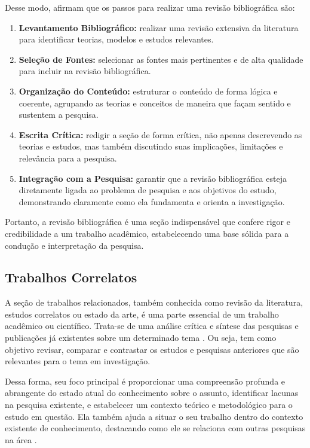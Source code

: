 Desse modo,  afirmam que os passos para realizar uma revisão bibliográfica são:
\begin{enumerate}[label=\roman*., itemsep=0pt, leftmargin=2.5cm]
    \item \textbf{Levantamento Bibliográfico:} realizar uma revisão extensiva da literatura para identificar teorias, modelos e estudos relevantes.
    \item \textbf{Seleção de Fontes:} selecionar as fontes mais pertinentes e de alta qualidade para incluir na revisão bibliográfica.
    \item \textbf{Organização do Conteúdo:} estruturar o conteúdo de forma lógica e coerente, agrupando as teorias e conceitos de maneira que façam sentido e sustentem a pesquisa.
    \item \textbf{Escrita Crítica:} redigir a seção de forma crítica, não apenas descrevendo as teorias e estudos, mas também discutindo suas implicações, limitações e relevância para a pesquisa.
    \item \textbf{Integração com a Pesquisa:} garantir que a revisão bibliográfica esteja diretamente ligada ao problema de pesquisa e aos objetivos do estudo, demonstrando claramente como ela fundamenta e orienta a investigação.
\end{enumerate}

Portanto, a revisão bibliográfica é uma seção indispensável que confere rigor e credibilidade a um trabalho acadêmico, estabelecendo uma base sólida para a condução e interpretação da pesquisa.

\subsection{Trabalhos Correlatos}

A seção de trabalhos relacionados, também conhecida como revisão da literatura, estudos correlatos ou estado da arte, é uma parte essencial de um trabalho acadêmico ou científico. Trata-se de uma análise crítica e síntese das pesquisas e publicações já existentes sobre um determinado tema \cite{Marconi2021}. Ou seja, tem como objetivo revisar, comparar e contrastar os estudos e pesquisas anteriores que são relevantes para o tema em investigação.

Dessa forma, seu foco principal é proporcionar uma compreensão profunda e abrangente do estado atual do conhecimento sobre o assunto, identificar lacunas na pesquisa existente, e estabelecer um contexto teórico e metodológico para o estudo em questão. Ela também ajuda a situar o seu trabalho dentro do contexto existente de conhecimento, destacando como ele se relaciona com outras pesquisas na área \cite{Wazlawick2021}.

